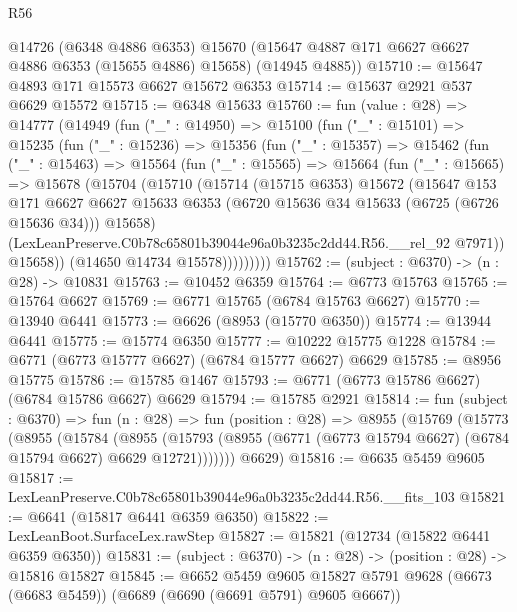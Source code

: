 \begin{lexlean}{R56}
\begin{coremodule}
      @14726
      (@6348 @4886 @6353)
      @15670
      (@15647 @4887 @171 @6627 @6627 @4886 @6353 (@15655 @4886) @15658)
      (@14945 @4885))
@15710 := @15647 @4893 @171 @15573 @6627 @15672 @6353
@15714 := @15637 @2921 @537 @6629 @15572
@15715 := @6348 @15633
@15760 := fun (value : @28) =>
  @14777
    (@14949
      (fun ("_" : @14950) =>
      @15100
        (fun ("_" : @15101) =>
        @15235
          (fun ("_" : @15236) =>
          @15356
            (fun ("_" : @15357) =>
            @15462
              (fun ("_" : @15463) =>
              @15564
                (fun ("_" : @15565) =>
                @15664
                  (fun ("_" : @15665) =>
                  @15678
                    (@15704
                      (@15710
                        (@15714
                          (@15715 @6353)
                          @15672
                          (@15647
                            @153
                            @171
                            @6627
                            @6627
                            @15633
                            @6353
                            (@6720 @15636 @34 @15633 (@6725 (@6726 @15636 @34)))
                            @15658)
                          (LexLeanPreserve.C0b78c65801b39044e96a0b3235c2dd44.R56.__rel_92 @7971))
                        @15658))
                    (@14650 @14734 @15578)))))))))
@15762 := (subject : @6370) -> (n : @28) -> @10831
@15763 := @10452 @6359
@15764 := @6773 @15763
@15765 := @15764 @6627
@15769 := @6771 @15765 (@6784 @15763 @6627)
@15770 := @13940 @6441
@15773 := @6626 (@8953 (@15770 @6350))
@15774 := @13944 @6441
@15775 := @15774 @6350
@15777 := @10222 @15775 @1228
@15784 := @6771 (@6773 @15777 @6627) (@6784 @15777 @6627) @6629
@15785 := @8956 @15775
@15786 := @15785 @1467
@15793 := @6771 (@6773 @15786 @6627) (@6784 @15786 @6627) @6629
@15794 := @15785 @2921
@15814 := fun (subject : @6370) =>
  fun (n : @28) =>
  fun (position : @28) =>
  @8955
    (@15769
      (@15773
        (@8955
          (@15784
            (@8955
              (@15793 (@8955 (@6771 (@6773 @15794 @6627) (@6784 @15794 @6627) @6629 @12721)))))))
      @6629)
@15816 := @6635 @5459 @9605
@15817 := LexLeanPreserve.C0b78c65801b39044e96a0b3235c2dd44.R56.__fits_103
@15821 := @6641 (@15817 @6441 @6359 @6350)
@15822 := LexLeanBoot.SurfaceLex.rawStep
@15827 := @15821 (@12734 (@15822 @6441 @6359 @6350))
@15831 := (subject : @6370) -> (n : @28) -> (position : @28) -> @15816 @15827
@15845 := @6652
    @5459
    @9605
    @15827
    @5791
    @9628
    (@6673 (@6683 @5459))
    (@6689 (@6690 (@6691 @5791) @9605 @6667))

\end{coremodule}
\end{lexlean}
